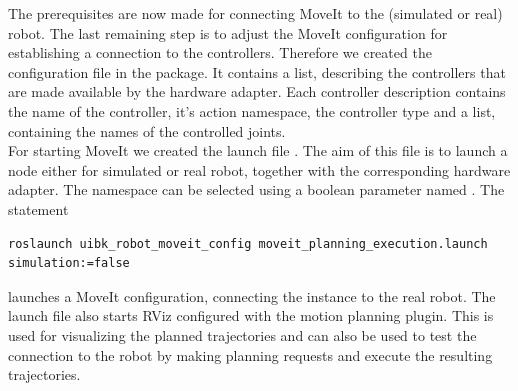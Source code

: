 The prerequisites are now made for connecting MoveIt to the (simulated or real) robot. The last remaining step is to adjust the MoveIt configuration for establishing a connection to the  controllers. Therefore we created the configuration file  in the  package. It contains a list, describing the controllers that are made available by the hardware adapter. Each controller description contains the name of the controller, it's action namespace, the controller type and a list, containing the names of the controlled joints.\\

For starting MoveIt we created the launch file . The aim of this file is to launch a  node either for simulated or real robot, together with the corresponding hardware adapter. The namespace can be selected using a boolean parameter named . The statement
{\small 
\begin{verbatim}
roslaunch uibk_robot_moveit_config moveit_planning_execution.launch simulation:=false
\end{verbatim}}
launches a MoveIt configuration, connecting the  instance to the real robot. The launch file also starts RViz configured with the motion planning plugin. This is used for visualizing the planned trajectories and can also be used to test the connection to the robot by making planning requests and execute the resulting trajectories.